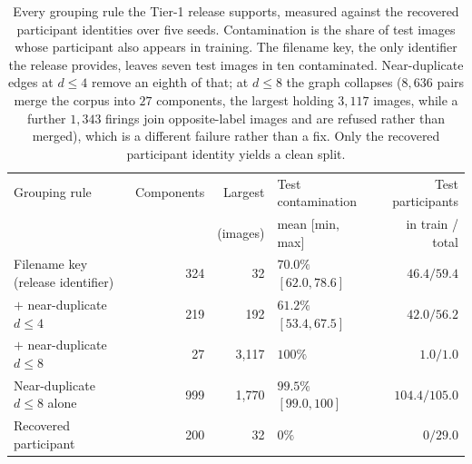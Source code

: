 \documentclass[pdflatex,sn-vancouver-num]{sn-jnl}
\begin{document}
\begin{table}[!tb]
\centering
\footnotesize
\caption{Every grouping rule the Tier-1 release supports, measured
against the recovered participant identities over five seeds.
Contamination is the share of test images whose participant also
appears in training. The filename key, the only identifier the
release provides, leaves seven test images in ten contaminated.
Near-duplicate edges at $d \leq 4$ remove an eighth of that; at
$d \leq 8$ the graph collapses ($8{,}636$ pairs merge the corpus into
$27$ components, the largest holding $3{,}117$ images, while a further
$1{,}343$ firings join opposite-label images and are refused rather than
merged), which is a different failure rather than a fix. Only the recovered participant
identity yields a clean split.}
\label{tab:tier1_rules}
\begin{tabular}{@{}lrrlr@{}}
\toprule
Grouping rule & Components & Largest & Test contamination & Test participants \\
              &            & (images) & mean [min, max] & in train / total \\
\midrule
Filename key (release identifier)   & 324 & 32      & $70.0\%$ $[62.0, 78.6]$ & $46.4 / 59.4$ \\
\quad $+$ near-duplicate $d \leq 4$ & 219 & 192     & $61.2\%$ $[53.4, 67.5]$ & $42.0 / 56.2$ \\
\quad $+$ near-duplicate $d \leq 8$ & 27  & 3{,}117 & $100\%$                 & $1.0 / 1.0$ \\
Near-duplicate $d \leq 8$ alone     & 999 & 1{,}770 & $99.5\%$ $[99.0, 100]$  & $104.4 / 105.0$ \\
Recovered participant               & 200 & 32      & $0\%$                   & $0 / 29.0$ \\
\bottomrule
\end{tabular}
\end{table}
\end{document}
